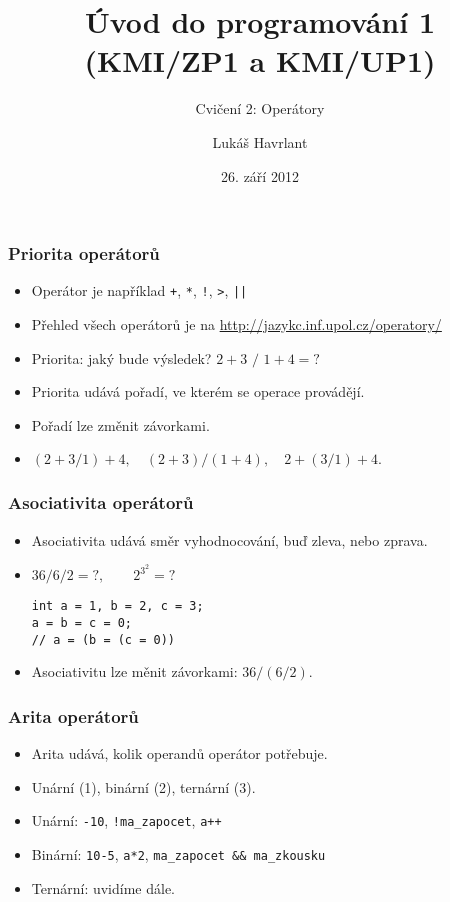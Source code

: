 \documentclass{beamer}
\title{Úvod do programování 1 (KMI/ZP1 a KMI/UP1)}
\subtitle{Cvičení 2: Operátory}
\author{Lukáš Havrlant}
\date{26. září 2012}
\institute{Univerzita Palackého}
\newenvironment{itemizex}%
  {\large \begin{itemize}%
    \setlength{\itemsep}{8pt}%
    \setlength{\parskip}{8pt}}%
  {\end{itemize}}
\begin{document}
\begin{frame}[t,plain]
\titlepage
\end{frame}

\begin{frame}[t,fragile]\frametitle{Priorita operátorů}
    \begin{itemizex}
      \item Operátor je například \texttt{+}, \texttt{*}, \texttt{!}, \texttt{>}, \texttt{||}
      \item Přehled všech operátorů je na \url{http://jazykc.inf.upol.cz/operatory/}
      \item Priorita: jaký bude výsledek? $2+3\,\,/\,\,1+4=?$
      \item Priorita udává pořadí, ve kterém se operace provádějí.
      \item Pořadí lze změnit závorkami.
      \item $(2+3/1)+4,\quad(2+3)/(1+4),\quad2+(3/1)+4.$
    \end{itemizex}
\end{frame}



\begin{frame}[t,fragile]\frametitle{Asociativita operátorů}
    \begin{itemizex}
      \item Asociativita udává směr vyhodnocování, buď zleva, nebo zprava. 
      \item $36/6/2=?,\qquad 2^{3^2}=?$
      \begin{verbatim} 
int a = 1, b = 2, c = 3;
a = b = c = 0;
// a = (b = (c = 0))
      \end{verbatim}
      \item Asociativitu lze měnit závorkami: $36/(6/2)$.
    \end{itemizex}
\end{frame}



\begin{frame}[t,fragile]\frametitle{Arita operátorů} 
  \begin{itemizex}
    \item Arita udává, kolik operandů operátor potřebuje.
    \item Unární (1), binární (2), ternární (3).
    \item Unární: \texttt{-10}, \texttt{!ma\_zapocet}, \texttt{a++}
    \item Binární: \texttt{10-5}, \texttt{a*2}, \texttt{ma\_zapocet \&\& ma\_zkousku}
    \item Ternární: uvidíme dále.
  \end{itemizex}
\end{frame}
\end{document}
